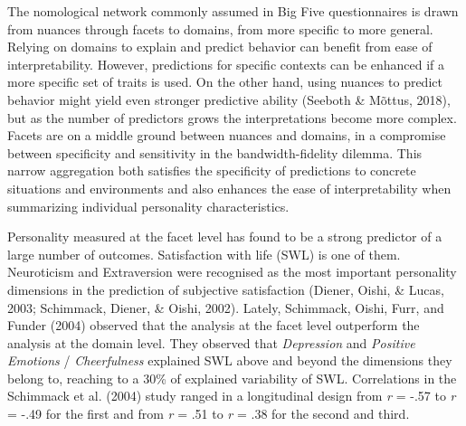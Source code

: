 \documentclass[,man,floatsintext]{apa6}
\begin{document}
The nomological network commonly assumed in Big Five questionnaires is
drawn from nuances through facets to domains, from more specific to more
general. Relying on domains to explain and predict behavior can benefit
from ease of interpretability. However, predictions for specific
contexts can be enhanced if a more specific set of traits is used. On
the other hand, using nuances to predict behavior might yield even
stronger predictive ability (Seeboth \& Mõttus, 2018), but as the number
of predictors grows the interpretations become more complex. Facets are
on a middle ground between nuances and domains, in a compromise between
specificity and sensitivity in the bandwidth-fidelity dilemma. This
narrow aggregation both satisfies the specificity of predictions to
concrete situations and environments and also enhances the ease of
interpretability when summarizing individual personality
characteristics.

Personality measured at the facet level has found to be a strong
predictor of a large number of outcomes. Satisfaction with life (SWL) is
one of them. Neuroticism and Extraversion were recognised as the most
important personality dimensions in the prediction of subjective
satisfaction (Diener, Oishi, \& Lucas, 2003; Schimmack, Diener, \&
Oishi, 2002). Lately, Schimmack, Oishi, Furr, and Funder (2004) observed
that the analysis at the facet level outperform the analysis at the
domain level. They observed that \emph{Depression} and \emph{Positive
Emotions} / \emph{Cheerfulness} explained SWL above and beyond the
dimensions they belong to, reaching to a 30\% of explained variability
of SWL. Correlations in the Schimmack et al. (2004) study ranged in a
longitudinal design from \emph{r} = -.57 to \emph{r} = -.49 for the
first and from \emph{r} = .51 to \emph{r} = .38 for the second and
third.
\end{document}
